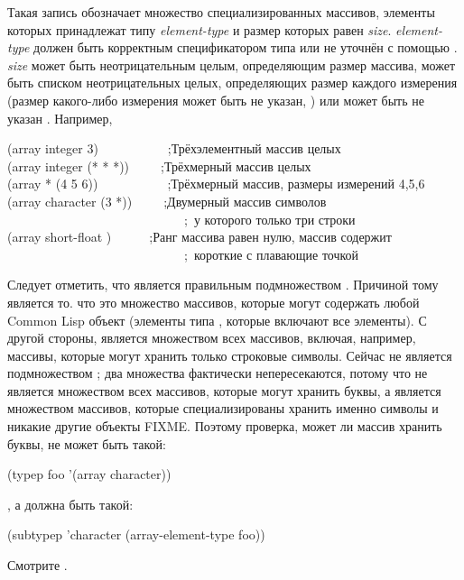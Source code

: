 \begin{flushdesc}
\item[\cd{(array \emph{element-type} \emph{size})}]
  Такая запись обозначает множество специализированных массивов, элементы которых
  принадлежат типу \emph{element-type} и размер которых равен \emph{size}.
  \emph{element-type} должен быть корректным спецификатором типа или не уточнён с
  помощью \cd{*}.
  \emph{size} может быть неотрицательным целым, определяющим размер массива,
  может быть списком неотрицательных целых, определяющих размер каждого измерения
  (размер какого-либо измерения может быть не указан, \cd{*}) или может быть не
  указан \cd{*}.
  Например,
  \begin{lisp}
    (array integer 3)~~~~~~~~~~~;\textrm{Трёхэлементный массив целых} \\
    (array integer (* * *))~~~~~;\textrm{Трёхмерный массив целых} \\
    (array * (4 5 6))~~~~~~~~~~~;\textrm{Трёхмерный массив, размеры измерений
      4,5,6} \\
    (array character (3 *))~~~~~;\textrm{Двумерный массив символов} \\
    ~~~~~~~~~~~~~~~~~~~~~~~~~~~~;~\textrm{у которого только три строки} \\
    (array short-float {\emptylist})~~~~~~;\textrm{Ранг массива равен нулю, массив содержит} \\
    ~~~~~~~~~~~~~~~~~~~~~~~~~~~~;~\textrm{короткие с плавающие точкой}
  \end{lisp}
  Следует отметить, что  является правильным подмножеством
  .
  Причиной тому является то. что  это множество массивов, которые
  могут содержать любой Common Lisp объект (элементы типа , которые включают
  все элементы). С другой стороны,  является множеством всех
  массивов, включая, например, массивы, которые могут хранить только строковые
  символы. Сейчас  не является подмножеством ;
  два множества фактически непересекаются, потому что  не
  является множеством всех массивов, которые могут хранить буквы, а
  является множеством массивов, которые специализированы хранить именно символы и
  никакие другие объекты FIXME. Поэтому проверка, может ли массив  хранить
  буквы, не может быть такой:
  \begin{lisp}
    (typep foo '(array character))
  \end{lisp}
  , а должна быть такой:
  \begin{lisp}
    (subtypep 'character (array-element-type foo))
  \end{lisp}
  Смотрите .


\end{flushdesc}
